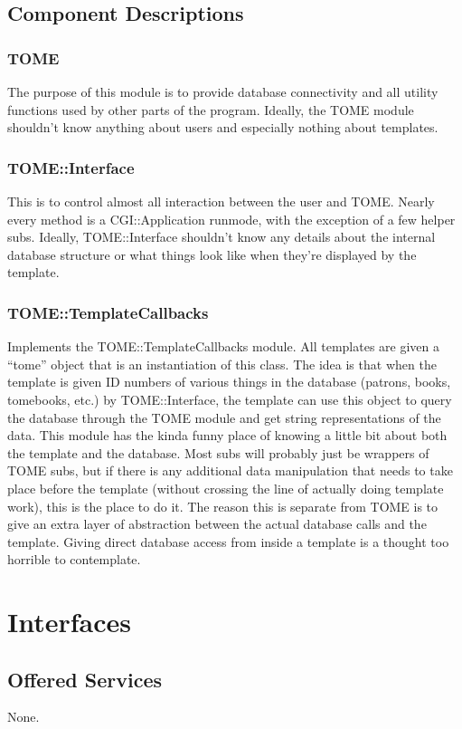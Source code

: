 \documentclass[12pt,titlepage]{article}
\begin{document}
\subsection{Component Descriptions}
\subsubsection{TOME}
The purpose of this module is to provide database connectivity and all utility functions used by other parts of the program. Ideally, the TOME module shouldn't know anything about users and especially nothing about templates.
\subsubsection{TOME::Interface}
This is to control almost all interaction between the user and TOME. Nearly every method is a CGI::Application runmode, with the exception of a few helper subs. Ideally, TOME::Interface shouldn't know any details about the internal database structure or what things look like when they're displayed by the template.
\subsubsection{TOME::TemplateCallbacks}
\label{templatecallbacks}
Implements the TOME::TemplateCallbacks module. All templates are given a ``tome'' object that is an instantiation of this class. The idea is that when the template is given ID numbers of various things in the database (patrons, books, tomebooks, etc.) by TOME::Interface, the template can use this object to query the database through the TOME module and get string representations of the data. This module has the kinda funny place of knowing a little bit about both the template and the database. Most subs will probably just be wrappers of TOME subs, but if there is any additional data manipulation that needs to take place before the template (without crossing the line of actually doing template work), this is the place to do it. The reason this is separate from TOME is to give an extra layer of abstraction between the actual database calls and the template. Giving direct database access from inside a template is a thought too horrible to contemplate.
\section{Interfaces}
\subsection{Offered Services}
None.
\end{document}
